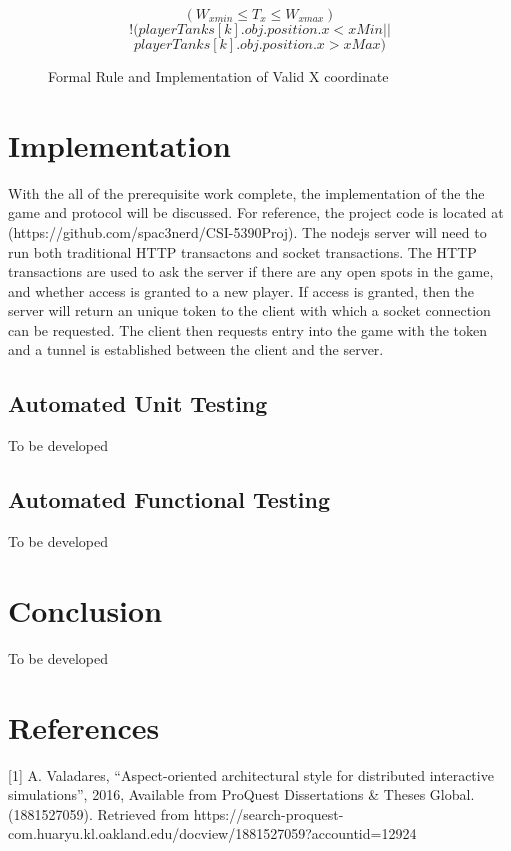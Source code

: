\documentclass[conference]{IEEEtran}
\begin{document}
\begin{figure}[htbp]
\[ (W_{xmin} \leq T_{x} \leq W_{xmax}) \]
\[ !(playerTanks[k].obj.position.x < xMin ||\]
\[ playerTanks[k].obj.position.x > xMax) \]
\caption{Formal Rule and Implementation of Valid X coordinate}
\end{figure}


\section{Implementation}

With the all of the prerequisite work complete, the implementation of the the game and protocol will be discussed. For reference,
the project code is located at (https://github.com/spac3nerd/CSI-5390Proj). The nodejs server 
will need to run both traditional HTTP transactons and socket transactions. The HTTP transactions are used to ask the server if 
there are any open spots in the game, and whether access is granted to a new player. If access is granted, then the server will return 
an unique token to the client with which a socket connection can be requested. The client then requests entry into the game 
with the token and a tunnel is established between the client and the server. 

\subsection{Automated Unit Testing}

To be developed 


\subsection{Automated Functional Testing}

To be developed 


\section{Conclusion}

To be developed 

\section{References}
[1] A. Valadares, “Aspect-oriented architectural style for distributed interactive simulations”, 2016, 
Available from ProQuest Dissertations & Theses Global. (1881527059). 
Retrieved from https://search-proquest-com.huaryu.kl.oakland.edu/docview/1881527059?accountid=12924
\end{document}
